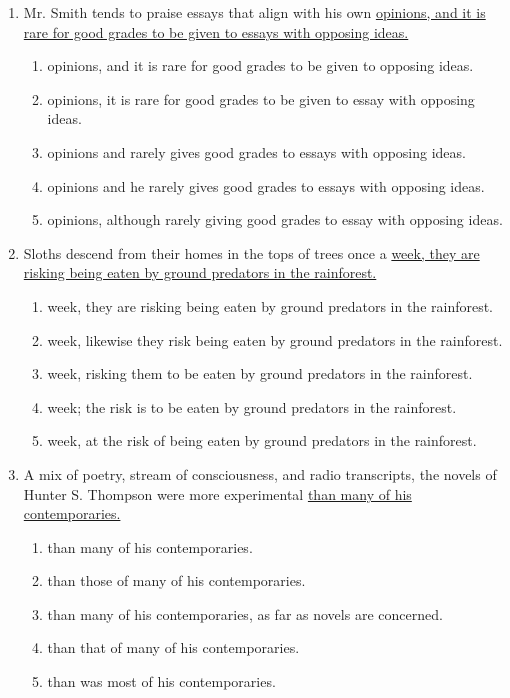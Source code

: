 \documentclass[12pt]{book}
\begin{document}
\begin{enumerate}
\bigskip
\item Mr. Smith tends to praise essays that align with his own \ul{opinions, and it is rare for good grades to be given to essays with opposing ideas.}
\begin{enumerate}[label=(\Alph*)]
\item opinions, and it is rare for good grades to be given to opposing ideas.
\item opinions, it is rare for good grades to be given to essay with opposing ideas.
\item opinions and rarely gives good grades to essays with opposing ideas.
\item opinions and he rarely gives good grades to essays with opposing ideas.
\item opinions, although rarely giving good grades to essay with opposing ideas.
\end{enumerate}

\newpage
\item Sloths descend from their homes in the tops of trees once a \ul{week, they are risking being eaten by ground predators in the rainforest.}
\begin{enumerate}[label=(\Alph*)]
\item week, they are risking being eaten by ground predators in the rainforest.
\item week, likewise they risk being eaten by ground predators in the rainforest.
\item week, risking them to be eaten by ground predators in the rainforest.
\item week; the risk is to be eaten by ground predators in the rainforest.
\item week, at the risk of being eaten by ground predators in the rainforest.
\end{enumerate}

\bigskip
\item A mix of poetry, stream of consciousness, and radio transcripts, the novels of Hunter S. Thompson were more experimental \underline{than many of his contemporaries.}
\begin{enumerate}[label=(\Alph*)]
\item than many of his contemporaries.
\item than those of many of his contemporaries.
\item than many of his contemporaries, as far as novels are concerned.
\item than that of many of his contemporaries.
\item than was most of his contemporaries.
\end{enumerate}


\end{enumerate}
\end{document}
